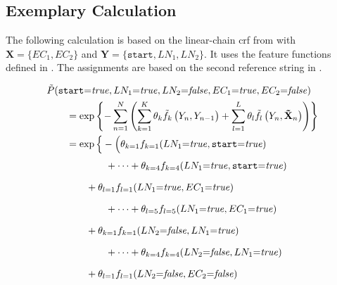 \newpage

\subsection{Exemplary Calculation}\label{app:subsec-lccrf-example-calculation}
The following calculation is based on the \gls{linear-chain crf} from  with $\mathbf{X}=\{EC_1,EC_2\}$ and $\mathbf{Y}=\{\texttt{start},LN_1,LN_2\}$.
It uses the \glspl{feature function} defined in .
The \glspl{assignment} are based on the second reference string in .

\begin{subequations}
\begin{equation*}
\begin{split}
  &\tilde{P}(\texttt{start}{=}\mathit{true},LN_1{=}\mathit{true},LN_2{=}\mathit{false},EC_1{=}\mathit{true},EC_2{=}\mathit{false})\\
  &\hspace{2em} = \exp\left\{ -\sum_{n=1}^N \left(\sum_{k=1}^K\theta_k \tilde{f}_k\left(\vphantom{\tilde{X}}Y_n,Y_{n-1}\right)+\sum_{l=1}^L\theta_l \tilde{f}_l\left(Y_n,\mathbf{\tilde{X}}_n\right)\right) \right\} \\
  &\hspace{2em} = \exp\Big\{-\Big(\theta_{k=1}f_{k=1}(LN_1{=}\mathit{true},\texttt{start}{=}\mathit{true})\\
  &\hspace{6em}\vphantom{\Big\{}+\cdots+\theta_{k=4}f_{k=4}(LN_1{=}\mathit{true},\texttt{start}{=}\mathit{true})\\
  &\hspace{4em}\vphantom{\Big\{}+\theta_{l=1}f_{l=1}(LN_1{=}\mathit{true},EC_1{=}\mathit{true})\\
  &\hspace{6em}\vphantom{\Big\{}+\cdots+\theta_{l=5}f_{l=5}(LN_1{=}\mathit{true},EC_1{=}\mathit{true})\\
  &\hspace{4em}\vphantom{\Big\{}+\theta_{k=1}f_{k=1}(LN_2{=}\mathit{false},LN_1{=}\mathit{true})\\
  &\hspace{6em}\vphantom{\Big\{}+\cdots+\theta_{k=4}f_{k=4}(LN_2{=}\mathit{false},LN_1{=}\mathit{true}) \\
  &\hspace{4em}\vphantom{\Big\{}+\theta_{l=1}f_{l=1}(LN_2{=}\mathit{false},EC_2{=}\mathit{false})\\

\end{split}
\end{equation*}
\end{subequations}
